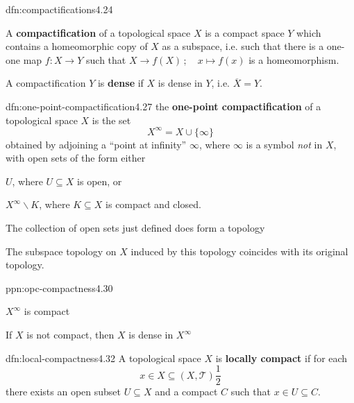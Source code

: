 \documentclass[landscape, 8pt]{extarticle}
\begin{document}
\begin{multicols}{3}
\begin{dfn}[Compactifications]{dfn:compactifications}{4.24}
	\begin{enumerate-tight}
	    \item A \textbf{compactification} of a topological space $X$ is a compact space $Y$ which contains a homeomorphic copy of $X$ as a subspace, i.e. such that there is a one-one map $f : X \to Y$ such that $X \to f(X)\,;\quad x \mapsto f(x)$ is a homeomorphism.
	    \item A compactification $Y$ is \textbf{dense} if $X$ is dense in $Y$, i.e. $\overline{X} = Y$.
	\end{enumerate-tight}
\end{dfn}


\begin{dfn}{dfn:one-point-compactification}{4.27}
	the \textbf{one-point compactification} of a topological space $X$ is the set
	\[X^{\infty} = X \cup \{\infty\}\]
	obtained by adjoining a ``point at infinity'' $\infty$, where $\infty$ is a symbol \textit{not} in $X$, with open sets of the form either
	\begin{enumerate-tight}
	    \item $U$, where $U \subseteq X$ is open, or 
	    \item $X^{\infty} \backslash K$, where $K \subseteq X$ is compact and closed.
	\end{enumerate-tight}

	\begin{enumerate-tight}
	    \item The collection of open sets just defined does form a topology
	    \item The subspace topology on $X$ induced by this topology coincides with its original topology.
	\end{enumerate-tight}
\end{dfn}

\begin{ppn}{ppn:opc-compactness}{4.30}
	\begin{enumerate-tight}
	    \item $X^{\infty}$ is compact
	    \item If $X$ is not compact, then $X$ is dense in $X^{\infty}$
	\end{enumerate-tight}
\end{ppn}

\begin{dfn}{dfn:local-compactness}{4.32}
	A topological space $X$ is \textbf{locally compact} if for each
	\[x\in X \subseteq (X, \mathcal{T}) \frac{1}{2} \]
	there exists an open subset $U \subseteq X$ and a compact $C$ such that $x\in U \subseteq C$.


\end{dfn}
\end{multicols}
\end{document}
